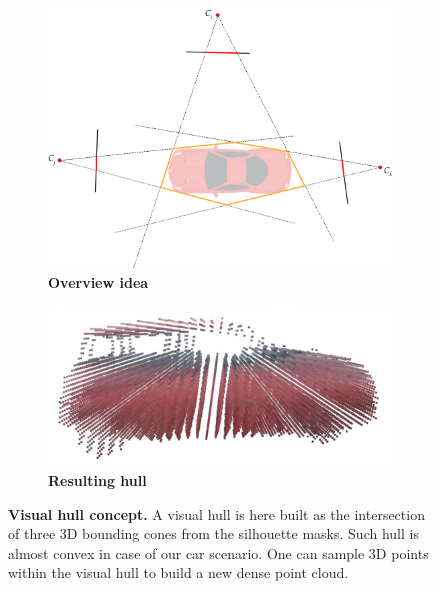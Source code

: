 \begin{figure}[htpb!]
  \centering
  \begin{subfigure}[b]{0.48\linewidth}
    \includegraphics[width=\linewidth]{images/gaussiansplatting/visualhull-idea.png}
    \caption{\textbf{Overview idea}}
    \label{fig:gs-vh-concept}
  \end{subfigure}
  \quad %
  \begin{subfigure}[b]{0.48\linewidth}
    \includegraphics[width=\linewidth]{images/gaussiansplatting/visualhull-res.png}
    \caption{\textbf{Resulting hull}}
    \label{fig:gs-vh-result}
  \end{subfigure}
  \caption{\textbf{Visual hull concept.} A visual hull is here built as the intersection of three 3D bounding cones from the silhouette masks. Such hull is almost convex in case of our car scenario. One can  sample 3D points within the visual hull to build a new dense point cloud.}
  \label{fig:gs-homography-view3}
\end{figure}


